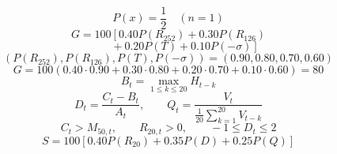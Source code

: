 \documentclass{article}
\begin{document}
\begin{equation}
P(x)=\frac{1}{2}\quad (n=1)
\end{equation}
\begin{equation}
G=100\left[0.40P(R_{252})+0.30P(R_{126})\right.
\end{equation}
\begin{equation}
\left.\qquad\quad +0.20P(T)+0.10P(-\sigma)\right]
\end{equation}
\begin{equation}
(P(R_{252}),P(R_{126}),P(T),P(-\sigma))=(0.90,0.80,0.70,0.60)
\end{equation}
\begin{equation}
G=100(0.40\cdot0.90+0.30\cdot0.80+0.20\cdot0.70+0.10\cdot0.60)=80
\end{equation}
\begin{equation}
B_t=\max_{1\leq k\leq20}H_{t-k}
\end{equation}
\begin{equation}
D_t=\frac{C_t-B_t}{A_t},\qquad Q_t=\frac{V_t}{\frac{1}{20}\sum_{k=1}^{20}V_{t-k}}
\end{equation}
\begin{equation}
C_t>M_{50,t},\qquad R_{20,t}>0,\qquad -1\leq D_t\leq2
\end{equation}
\begin{equation}
S=100\left[0.40P(R_{20})+0.35P(D)+0.25P(Q)\right]
\end{equation}
\end{document}
